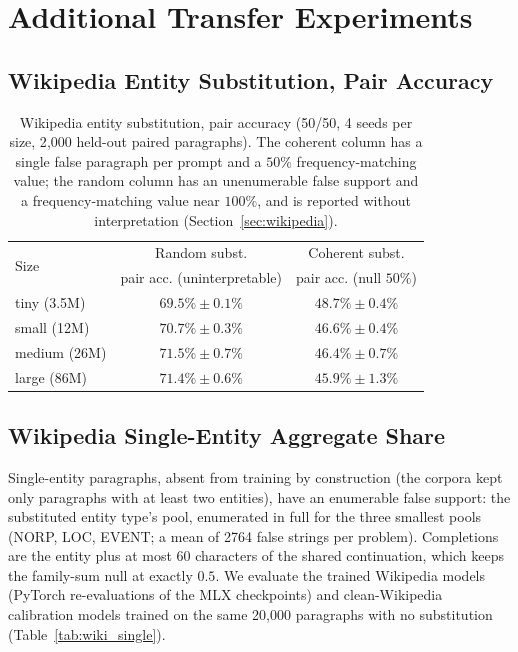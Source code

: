 \documentclass{article}
\begin{document}
\section{Additional Transfer Experiments}
\label{app:transfer}

\subsection{Wikipedia Entity Substitution, Pair Accuracy}

\begin{table}[ht]
\centering
\small
\begin{tabular}{lcc}
\toprule
\multirow{2}{*}{Size} & Random subst. & Coherent subst. \\
 & pair acc. (uninterpretable) & pair acc. (null $50\%$) \\
\midrule
tiny (3.5M)   & $69.5\% \pm 0.1\%$ & $48.7\% \pm 0.4\%$ \\
small (12M)   & $70.7\% \pm 0.3\%$ & $46.6\% \pm 0.4\%$ \\
medium (26M)  & $71.5\% \pm 0.7\%$ & $46.4\% \pm 0.7\%$ \\
large (86M)   & $71.4\% \pm 0.6\%$ & $45.9\% \pm 1.3\%$ \\
\bottomrule
\end{tabular}
\caption{Wikipedia entity substitution, pair accuracy (50/50, 4 seeds per size, 2{,}000 held-out paired paragraphs). The coherent column has a single false paragraph per prompt and a $50\%$ frequency-matching value; the random column has an unenumerable false support and a frequency-matching value near $100\%$, and is reported without interpretation (Section~\ref{sec:wikipedia}).}
\label{tab:wikipedia}
\end{table}

\subsection{Wikipedia Single-Entity Aggregate Share}

Single-entity paragraphs, absent from training by construction (the corpora kept only paragraphs with at least two entities), have an enumerable false support: the substituted entity type's pool, enumerated in full for the three smallest pools (NORP, LOC, EVENT; a mean of 2764 false strings per problem). Completions are the entity plus at most 60 characters of the shared continuation, which keeps the family-sum null at exactly $0.5$. We evaluate the trained Wikipedia models (PyTorch re-evaluations of the MLX checkpoints) and clean-Wikipedia calibration models trained on the same 20{,}000 paragraphs with no substitution (Table~\ref{tab:wiki_single}).
\end{document}
